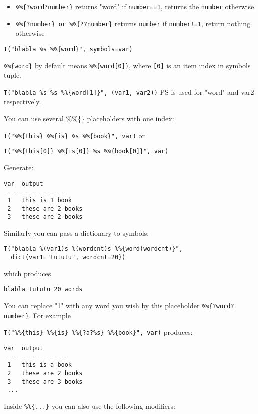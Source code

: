 \documentclass[justified,sixbynine,notoc]{tufte-book}
\def\ft{\small\tt}
\begin{document}
\begin{fullwidth}
\begin{itemize}
\item {\ft \%\%\{?word?number\}} returns "word" if {\ft number==1}, returns the {\ft number} otherwise

\item {\ft \%\%\{?number\} or \%\%\{??number\}} returns {\ft number} if {\ft number!=1}, return nothing otherwise
\end{itemize}

{\ft T("blabla \%s \%\%\{word\}", symbols=var)}

{\ft \%\%\{word\}} by default means {\ft \%\%\{word[0]\}},
where {\ft [0]} is an item index in symbols tuple.

{\ft T("blabla \%s \%s \%\%\{word[1]\}", (var1, var2))}
PS is used for "word" and var2 respectively.

You can use several \%\%\{\} placeholders with one index:

{\ft T("\%\%\{this\} \%\%\{is\} \%s \%\%\{book\}", var)}
\noindent or

{\ft T("\%\%\{this[0]\} \%\%\{is[0]\} \%s \%\%\{book[0]\}", var)}

Generate:

\begin{lstlisting}
var  output
------------------
 1   this is 1 book
 2   these are 2 books
 3   these are 2 books
\end{lstlisting}

Similarly you can pass a dictionary to symbols:

\begin{lstlisting}
T("blabla %(var1)s %(wordcnt)s %%{word(wordcnt)}",
  dict(var1="tututu", wordcnt=20))
\end{lstlisting}
\noindent which produces

\begin{lstlisting}
blabla tututu 20 words
\end{lstlisting}

You can replace "1" with any word you wish by this placeholder {\ft \%\%\{?word?number\}}.
For example

{\ft T("\%\%\{this\} \%\%\{is\} \%\%\{?a?\%s\} \%\%\{book\}", var)}
\noindent produces:

\begin{lstlisting}
var  output
------------------
 1   this is a book
 2   these are 2 books
 3   these are 3 books
 ...
\end{lstlisting}

Inside {\ft \%\%\{...\}} you can also use the following modifiers:


\end{fullwidth}
\end{document}
